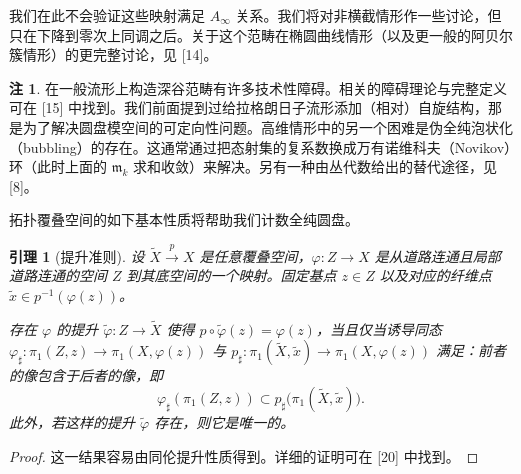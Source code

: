 \documentclass[11pt,a4paper]{article}
\theoremstyle{plain}
\newtheorem{lemma}[theorem]{引理}
\theoremstyle{definition}
\newtheorem{remark}[theorem]{注}
\begin{document}
我们在此不会验证这些映射满足 $A_\infty$ 关系。我们将对非横截情形作一些讨论，但只在下降到零次上同调之后。关于这个范畴在椭圆曲线情形（以及更一般的阿贝尔簇情形）的更完整讨论，见 [14]。
\begin{remark}
在一般流形上构造深谷范畴有许多技术性障碍。相关的障碍理论与完整定义可在 [15] 中找到。我们前面提到过给拉格朗日子流形添加（相对）自旋结构，那是为了解决圆盘模空间的可定向性问题。高维情形中的另一个困难是伪全纯泡状化（bubbling）的存在。这通常通过把态射集的复系数换成万有诺维科夫（Novikov）环（此时上面的 $\mathfrak{m}_k$ 求和收敛）来解决。另有一种由丛代数给出的替代途径，见 [8]。
\end{remark}

拓扑覆叠空间的如下基本性质将帮助我们计数全纯圆盘。

\begin{lemma}[提升准则]
设 $\tilde X\xrightarrow{p}X$ 是任意覆叠空间，$\varphi\colon Z\to X$ 是从道路连通且局部道路连通的空间 $Z$ 到其底空间的一个映射。固定基点 $z\in Z$ 以及对应的纤维点 $\tilde x\in p^{-1}(\varphi(z))$。

存在 $\varphi$ 的提升 $\tilde\varphi\colon Z\to\tilde X$ 使得 $p\circ\tilde\varphi(z)=\varphi(z)$，当且仅当诱导同态 $\varphi_\sharp\colon\pi_1(Z,z)\to\pi_1(X,\varphi(z))$ 与 $p_\sharp\colon\pi_1(\tilde X,\tilde x)\to\pi_1(X,\varphi(z))$ 满足：前者的像包含于后者的像，即
\[
\varphi_\sharp(\pi_1(Z,z))\subset p_\sharp\bigl(\pi_1(\tilde X,\tilde x)\bigr).
\]
此外，若这样的提升 $\tilde\varphi$ 存在，则它是唯一的。
\end{lemma}
\begin{proof}
这一结果容易由同伦提升性质得到。详细的证明可在 [20] 中找到。
\end{proof}
\end{document}
